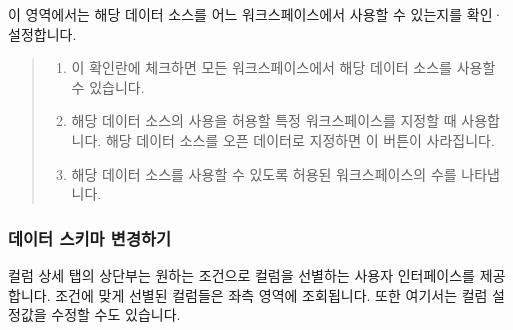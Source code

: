 \documentclass[letterpaper,10pt,english]{sphinxmanual}
\begin{document}

이 영역에서는 해당 데이터 소스를 어느 워크스페이스에서 사용할 수 있는지를 확인·설정합니다.
\begin{quote}

\begin{figure}[H]
\centering

\noindent{}
\end{figure}
\begin{enumerate}
\def\theenumi{\arabic{enumi}}
\def\labelenumi{\theenumi .}
\makeatletter\def\p@enumii{\p@enumi \theenumi .}\makeatother
\item {} 
 이 확인란에 체크하면 모든 워크스페이스에서 해당 데이터 소스를 사용할 수 있습니다.

\item {} 
 해당 데이터 소스의 사용을 허용할 특정 워크스페이스를 지정할 때 사용합니다. 해당 데이터 소스를 오픈 데이터로 지정하면 이 버튼이 사라집니다.

\item {} 
 해당 데이터 소스를 사용할 수 있도록 허용된 워크스페이스의 수를 나타냅니다.

\end{enumerate}
\end{quote}


\subsubsection{데이터 스키마 변경하기}
\label{\detokenize{discovery/part02/data_source_detail_view:id4}}
컬럼 상세 탭의 상단부는 원하는 조건으로 컬럼을 선별하는 사용자 인터페이스를 제공합니다. 조건에 맞게 선별된 컬럼들은 좌측 영역에 조회됩니다. 또한 여기서는 컬럼 설정값을 수정할 수도 있습니다.
\end{document}
